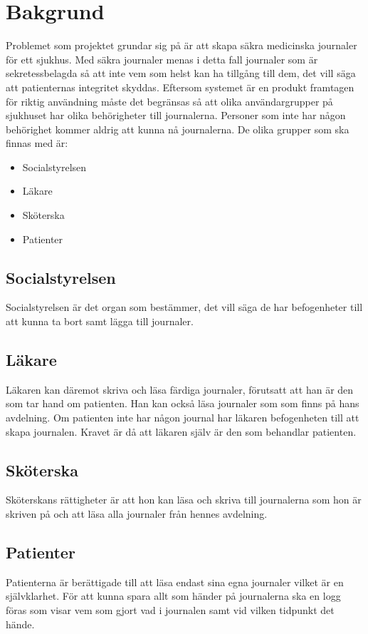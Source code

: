 \section{Bakgrund}

Problemet som projektet grundar sig på är att skapa säkra medicinska journaler för ett sjukhus. Med säkra journaler menas i detta fall journaler som är sekretessbelagda så att inte vem som helst kan ha tillgång till dem, det vill säga att patienternas integritet skyddas. Eftersom systemet är en produkt framtagen för riktig användning måste det begränsas så att olika användargrupper på sjukhuset har olika behörigheter till journalerna. Personer som inte har någon behörighet kommer aldrig att kunna nå journalerna. De olika grupper som ska finnas med är:

\begin{itemize}
\item{Socialstyrelsen}
\item{Läkare}
\item{Sköterska}
\item{Patienter}
\end{itemize} 


\subsection{Socialstyrelsen}
Socialstyrelsen är det organ som bestämmer, det vill säga de har befogenheter till att kunna ta bort samt lägga till journaler. 

\subsection{Läkare}
Läkaren kan däremot skriva och läsa färdiga journaler, förutsatt att han är den som tar hand om patienten. Han kan också läsa journaler som som finns på hans avdelning. Om patienten inte har någon journal har läkaren befogenheten till att skapa journalen. Kravet är då att läkaren själv är den som behandlar patienten.

\subsection{Sköterska}
Sköterskans rättigheter är att hon kan läsa och skriva till journalerna som hon är skriven på och att läsa alla journaler från hennes avdelning.

\subsection{Patienter}
Patienterna är berättigade till att läsa endast sina egna journaler vilket är en självklarhet.
För att kunna spara allt som händer på journalerna ska en logg föras som visar vem som gjort vad i journalen samt vid vilken tidpunkt det hände.
